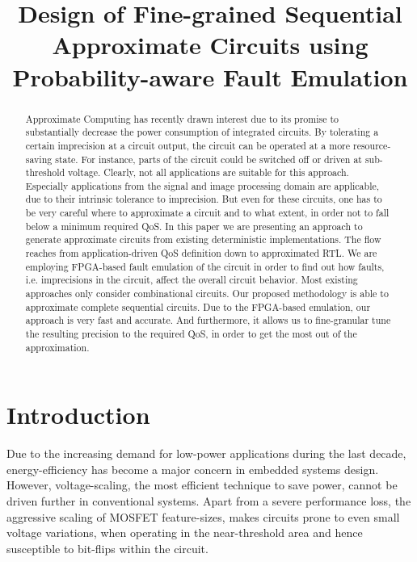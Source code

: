 \documentclass[conference]{IEEEtran}
\begin{document}
\title{Design of Fine-grained Sequential Approximate Circuits using Probability-aware Fault Emulation}


\author{
\IEEEauthorblockA{}
\and
{}
\IEEEauthorblockA{}
}


\maketitle


\begin{abstract}
Approximate Computing has recently drawn interest due to its promise to substantially decrease the power consumption of integrated circuits. By tolerating a certain imprecision at a circuit output, the circuit can be operated at a more resource-saving state. For instance, parts of the circuit could be switched off or driven at sub-threshold voltage. Clearly, not all applications are suitable for this approach. Especially applications from the signal and image processing domain are applicable, due to their intrinsic tolerance to imprecision. But even for these circuits, one has to be very careful where to approximate a circuit and to what extent, in order not to fall below a minimum required QoS.
In this paper we are presenting an approach to generate approximate circuits from existing deterministic implementations. The flow reaches from application-driven QoS definition down to approximated RTL. We are employing FPGA-based fault emulation of the circuit in order to find out how faults, i.e. imprecisions in the circuit, affect the overall circuit behavior.
Most existing approaches only consider combinational circuits. Our proposed methodology is able to approximate complete sequential circuits. Due to the FPGA-based emulation, our approach is very fast and accurate. And furthermore, it allows us to fine-granular tune the resulting precision to the required QoS, in order to get the most out of the approximation.
\end{abstract}

\IEEEpeerreviewmaketitle



\section{Introduction}
Due to the increasing demand for low-power applications during the last decade, energy-efficiency has become a major concern in embedded systems design. However, voltage-scaling, the most efficient technique to save power, cannot be driven further in conventional systems. Apart from a severe performance loss, the aggressive scaling of \mbox{MOSFET} feature-sizes, makes circuits prone to even small voltage variations, when operating in the near-threshold area and hence susceptible to bit-flips within the circuit.
\end{document}
